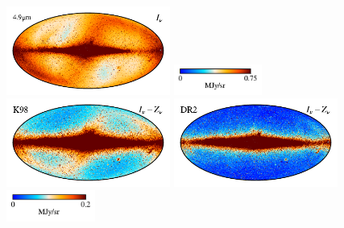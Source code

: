 \documentclass[twocolumn]{aa}
\begin{document}
\begin{figure}
    \includegraphics[height=2.90cm]{figs/compare_freq_maps/cosmoglobe_ma_04.pdf}%
    \includegraphics[width=2.90cm,angle=90]{figs/compare_freq_maps/cbar_tot_04.pdf}%
    \includegraphics[height=2.90cm]{figs/compare_freq_maps/dirbe_zsma_04.pdf}%
    \includegraphics[height=2.90cm]{figs/compare_freq_maps/cosmoglobe_zsma_04.pdf}%
    \includegraphics[width=2.90cm,angle=90]{figs/compare_freq_maps/cbar_04.pdf}%
      \\


\end{figure}
\end{document}
